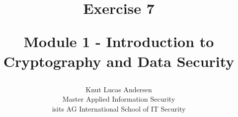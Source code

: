 \title{ 
	\begin{center} \textbf{ Exercise 7 } \end{center}
	\begin{center} {\large Module 1 - Introduction to Cryptography and Data Security } \end{center}
}

\author{ 
	Knut Lucas Andersen \\
	Master Applied Information Security \\
	isits AG International School of IT Security
}